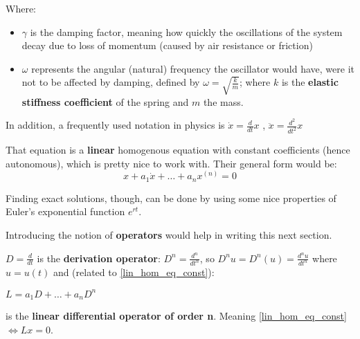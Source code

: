 Where:
\begin{itemize}
  \item $\gamma$ is the damping factor, meaning how quickly the oscillations of the system decay due to loss of momentum (caused by air resistance or friction)

  \item $\omega$ represents the angular (natural) frequency the oscillator would have, were it not to be affected by damping, defined by
    $\omega = \sqrt{\frac{k}{m}}$; where $k$ is the \textbf{elastic stiffness coefficient} of the spring and $m$ the mass.
\end{itemize}

In addition, a frequently used notation in physics is
$\dot{x} = \frac{d}{dt}x$ , $\ddot{x}=\frac{d^2}{dt^2}x$

That equation is a \textbf{linear} homogenous equation with constant coefficients (hence autonomous), which is pretty nice to work with. Their general form would be:
\begin{equation}\label{lin_hom_eq_const}
  x + a_1\dot{x}+ \dots +a_{n} x^{(n)} = 0
\end{equation}

Finding exact solutions, though, can be done by using some nice properties of Euler's exponential function $e^{rt}$.

Introducing the notion of \textbf{operators} would help in writing this next section.

\begin{definition}
  $D = \frac{d}{dt}$ is the \textbf{derivation operator}:
  $D^n = \frac{d^n}{dt^n}$, so $D^nu = D^n(u) =\frac{d^nu}{dt^n}$ where $u=u(t)$ and (related to \ref{lin_hom_eq_const}): \par
  \hspace{20pt} $L = a_1D + \dots + a_nD^n$ \par
  \hspace{20pt} is the \textbf{linear differential operator of order n}. Meaning \ref{lin_hom_eq_const} $\iff Lx=0$.
\end{definition}

